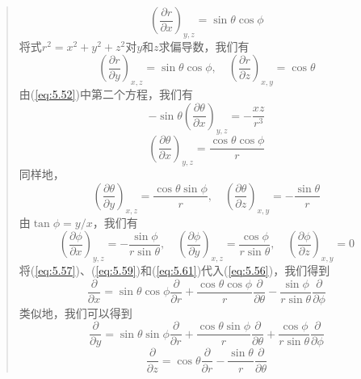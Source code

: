 \begin{quote}
\begin{equation*}
        \end{equation*}
        \begin{equation}
            \left(\frac{\partial r}{\partial x}\right)_{y,z} = \sin\theta\cos\phi
            \label{eq:5.57}
        \end{equation}
        将式$r^2 = x^2 + y^2 + z^2$对$y$和$z$求偏导数，我们有
        \begin{equation}
            \left(\frac{\partial r}{\partial y}\right)_{x,z} = \sin\theta\cos\phi, \quad \left(\frac{\partial r}{\partial z}\right)_{x,y} = \cos\theta
            \label{eq:5.58}
        \end{equation}
        由(\ref{eq:5.52})中第二个方程，我们有
        \begin{equation*}
            -\sin\theta\left(\frac{\partial \theta}{\partial x}\right)_{y,z} = -\frac{xz}{r^3}
        \end{equation*}
        \begin{equation}
            \left(\frac{\partial \theta}{\partial x}\right)_{y,z} = \frac{\cos\theta\cos\phi}{r}
            \label{eq:5.59}
        \end{equation}
        同样地，
        \begin{equation}
            \left(\frac{\partial \theta}{\partial y}\right)_{x,z} = \frac{\cos\theta\sin\phi}{r}, \quad \left(\frac{\partial \theta}{\partial z}\right)_{x,y} = -\frac{\sin\theta}{r}
            \label{eq:5.60}
        \end{equation}
        由$\tan\phi = y/x$，我们有
        \begin{equation}
            \left(\frac{\partial\phi}{\partial x}\right)_{y,z} = -\frac{\sin\phi}{r\sin\theta}, \quad \left(\frac{\partial\phi}{\partial y}\right)_{x,z} = \frac{\cos\phi}{r\sin\theta}, \quad \left(\frac{\partial\phi}{\partial z}\right)_{x,y} = 0
            \label{eq:5.61}
        \end{equation}
        将(\ref{eq:5.57})、(\ref{eq:5.59})和(\ref{eq:5.61})代入(\ref{eq:5.56})，我们得到
        \begin{equation}
            \frac{\partial}{\partial x} = \sin\theta\cos\phi\frac{\partial}{\partial r} + \frac{\cos\theta\cos\phi}{r}\frac{\partial}{\partial \theta} - \frac{\sin\phi}{r\sin\theta}\frac{\partial}{\partial \phi}
            \label{eq:5.62}
        \end{equation}
        类似地，我们可以得到
        \begin{equation}
            \frac{\partial}{\partial y} = \sin\theta\sin\phi\frac{\partial}{\partial r} + \frac{\cos\theta\sin\phi}{r}\frac{\partial}{\partial \theta} + \frac{\cos\phi}{r\sin\theta}\frac{\partial}{\partial \phi}
            \label{eq:5.63}
        \end{equation}
        \begin{equation}
            \frac{\partial}{\partial z} = \cos\theta\frac{\partial}{\partial r} - \frac{\sin\theta}{r}\frac{\partial}{\partial \theta}
            \label{eq:5.64}
        \end{equation}
    \end{quote}

